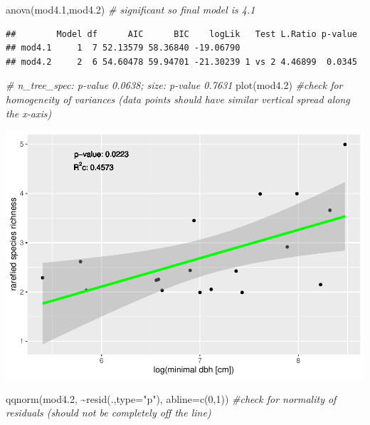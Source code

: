\documentclass[
]{article}
\newenvironment{Shaded}{\begin{snugshade}}{\end{snugshade}}
\newcommand{\AttributeTok}[1]{\textcolor[rgb]{0.77,0.63,0.00}{#1}}
\newcommand{\CommentTok}[1]{\textcolor[rgb]{0.56,0.35,0.01}{\textit{#1}}}
\newcommand{\DecValTok}[1]{\textcolor[rgb]{0.00,0.00,0.81}{#1}}
\newcommand{\FloatTok}[1]{\textcolor[rgb]{0.00,0.00,0.81}{#1}}
\newcommand{\FunctionTok}[1]{\textcolor[rgb]{0.00,0.00,0.00}{#1}}
\newcommand{\NormalTok}[1]{#1}
\newcommand{\SpecialCharTok}[1]{\textcolor[rgb]{0.00,0.00,0.00}{#1}}
\newcommand{\StringTok}[1]{\textcolor[rgb]{0.31,0.60,0.02}{#1}}
\begin{document}
\begin{Shaded}
\begin{Highlighting}[]
\FunctionTok{anova}\NormalTok{(mod4}\FloatTok{.1}\NormalTok{,mod4}\FloatTok{.2}\NormalTok{) }\CommentTok{\# significant so final model is 4.1}
\end{Highlighting}
\end{Shaded}

\begin{verbatim}
##        Model df      AIC      BIC    logLik   Test L.Ratio p-value
## mod4.1     1  7 52.13579 58.36840 -19.06790                       
## mod4.2     2  6 54.60478 59.94701 -21.30239 1 vs 2 4.46899  0.0345
\end{verbatim}

\begin{Shaded}
\begin{Highlighting}[]
\CommentTok{\# n\_tree\_spec: p{-}value 0.0638; size: p{-}value 0.7631}
\FunctionTok{plot}\NormalTok{(mod4}\FloatTok{.2}\NormalTok{) }\CommentTok{\#check for homogeneity of variances (data points should have similar vertical spread along the x{-}axis)}
\end{Highlighting}
\end{Shaded}

\includegraphics{birdsdataanalysis_files/figure-latex/unnamed-chunk-11-1.pdf}

\begin{Shaded}
\begin{Highlighting}[]
\FunctionTok{qqnorm}\NormalTok{(mod4}\FloatTok{.2}\NormalTok{, }\SpecialCharTok{\textasciitilde{}}\FunctionTok{resid}\NormalTok{(.,}\AttributeTok{type=}\StringTok{"p"}\NormalTok{), }\AttributeTok{abline=}\FunctionTok{c}\NormalTok{(}\DecValTok{0}\NormalTok{,}\DecValTok{1}\NormalTok{)) }\CommentTok{\#check for normality of residuals (should not be completely off the line)}
\end{Highlighting}
\end{Shaded}
\end{document}
